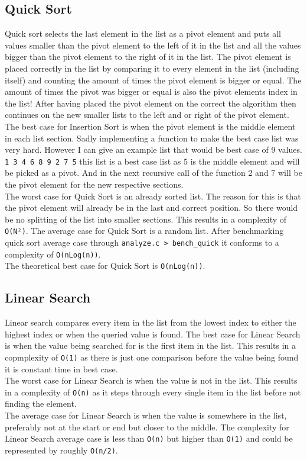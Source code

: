 \documentclass{article}
\begin{document}
    \subsection{Quick Sort}
    Quick sort selects the last element in the list as a pivot element and puts all values smaller than the pivot element to the left of it in the list and all the values bigger than the pivot element to the right of it in the list.
    The pivot element is placed correctly in the list by comparing it to every element in the list (including itself) and counting the amount of times the pivot element is bigger or equal.
    The amount of times the pivot was bigger or equal is also the pivot elements index in the list! After having placed the pivot element on the correct the algorithm then continues on the new smaller lists to the left and or right of the pivot element.
    The best case for Insertion Sort is when the pivot element is the middle element in each list section. Sadly implementing a function to make the best case list was very hard. However I can give an example list that would be best case of 9 values.
    \texttt{1 3 4 6 8 9 2 7 5} this list is a best case list as 5 is the middle element and will be picked as a pivot. And in the next recursive call of the function 2 and 7 will be the pivot element for the new respective sections.\\
    The worst case for Quick Sort is an already sorted list. The reason for this is that the pivot element will already be in the last and correct position. So there would be no splitting of the list into smaller sections. This results in a complexity of \texttt{O(N²)}.
    The average case for Quick Sort is a random list. After benchmarking quick sort average case through \texttt{analyze.c > bench\_quick} it conforms to a complexity of \texttt{O(nLog(n))}.\\
    The theoretical best case for Quick Sort is \texttt{O(nLog(n))}.
    \subsection{Linear Search}
    Linear search compares every item in the list from the lowest index to either the highest index or when the queried value is found.
    The best case for Linear Search is when the value being searched for is the first item in the list. This results in a copmplexity of \texttt{O(1)} as there is just one comparison before the value being found it is constant time in best case.\\
    The worst case for Linear Search is when the value is not in the list. This results in a complexity of \texttt{O(n)} as it steps through every single item in the list before not finding the element.\\
    The average case for Linear Search is when the value is somewhere in the list, preferably not at the start or end but closer to the middle. The complexity for Linear Search average case is less than \texttt{0(n)} but higher than \texttt{O(1)} and could be represented by roughly \texttt{O(n/2)}.
\end{document}
